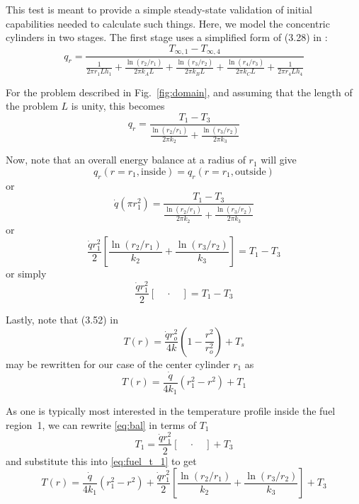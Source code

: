 \documentclass[12pt]{article}
\begin{document}
This test is meant to provide a simple steady-state validation of initial capabilities needed to calculate
such things. Here, we model the concentric cylinders in two stages. The first stage uses a simplified form
of (3.28) in
\cite{incropera81}:
%
\begin{equation}
q_r = \frac{T_{\infty,1} - T_{\infty, 4}}{\frac{1}{2\pi r_1 L h_1} + \frac{\ln (r_2 / r_1)}{2\pi k_A L} +
\frac{\ln (r_3 / r_2)}{2 \pi k_B L} + \frac{\ln(r_4/r_3)}{2\pi k_C L} + \frac{1}{2\pi r_4 L h_4}}
\end{equation}

For the problem described in Fig.~\ref{fig:domain}, and assuming that the length of the problem $L$ is
unity, this becomes
%
\begin{equation}
q_r = \frac{T_{1} - T_{3}}{\frac{\ln (r_2 / r_1)}{2\pi k_2} +
\frac{\ln (r_3 / r_2)}{2 \pi k_3} }
\label{eq:resist}
\end{equation}

Now, note that an overall energy balance at a radius of $r_1$ will give
%
\begin{equation}
q_r(r=r_1, \mathrm{inside}) =
q_r(r=r_1, \mathrm{outside}) 
\label{eq:e_balance}
\end{equation}
or
\begin{equation}
\dot{q} (\pi r_1^2) =
\frac{T_{1} - T_{3}}{\frac{\ln (r_2 / r_1)}{2\pi k_2} +
\frac{\ln (r_3 / r_2)}{2 \pi k_3} }
\label{eq:energy_balance}
\end{equation}
or
\begin{equation}
\frac{\dot{q} r_1^2}{2} \left[
\frac{\ln (r_2 / r_1)}{k_2} +
\frac{\ln (r_3 / r_2)}{k_3} \right] =
T_{1} - T_{3}
\end{equation}
or simply
\begin{equation}
\frac{\dot{q} r_1^2}{2} \left[ \quad \cdot \quad \right] =
T_{1} - T_{3}
\label{eq:bal}
\end{equation}

Lastly, note that (3.52) in \cite{incropera81}
%
\begin{equation}
T(r) = \frac{\dot{q} r_o^2}{4 k} \left( 1 - \frac{r^2}{r_o^2}\right) + T_s
\end{equation}
%
may be rewritten for our case of the center cylinder $r_1$ as
%
\begin{equation}
T(r) = \frac{\dot{q}}{4 k_1} \left( r_1^2 - r^2\right) + T_1
\label{eq:fuel_t_1}
\end{equation}

As one is typically most interested in the temperature profile inside the fuel region~1, we can rewrite
\eqref{eq:bal} in terms of $T_1$
%
\begin{equation}
T_{1} =
\frac{\dot{q} r_1^2}{2} \left[ \quad \cdot \quad \right]
+ T_{3}
\end{equation}
%
and substitute this into \eqref{eq:fuel_t_1} to get
%
\begin{equation}
T(r) = \frac{\dot{q}}{4 k_1} \left( r_1^2 - r^2\right) + 
\frac{\dot{q} r_1^2}{2} \left[
\frac{\ln (r_2 / r_1)}{k_2} +
\frac{\ln (r_3 / r_2)}{k_3} \right] + T_3
\label{eq:fuel_t_2}
\end{equation}
\end{document}
